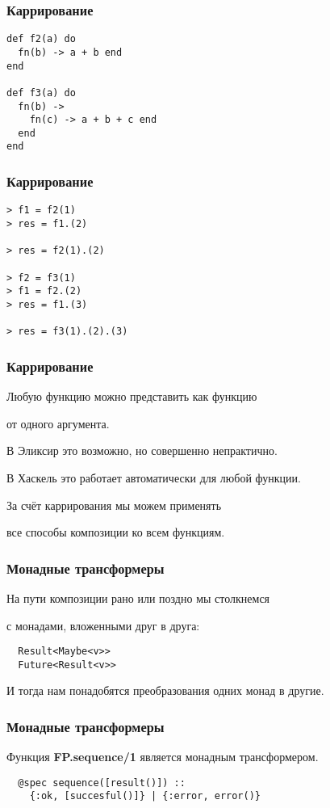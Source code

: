 \documentclass[10pt]{beamer}
\begin{document}
\begin{frame}[fragile]
  \frametitle{Каррирование}
  \begin{lstlisting}
def f2(a) do
  fn(b) -> a + b end
end

def f3(a) do
  fn(b) ->
    fn(c) -> a + b + c end
  end
end
  \end{lstlisting}
\end{frame}

\begin{frame}[fragile]
  \frametitle{Каррирование}
  \begin{lstlisting}
> f1 = f2(1)
> res = f1.(2)

> res = f2(1).(2)

> f2 = f3(1)
> f1 = f2.(2)
> res = f1.(3)

> res = f3(1).(2).(3)
  \end{lstlisting}
\end{frame}

\begin{frame}
  \frametitle{Каррирование}
  Любую функцию можно представить как функцию
  \par
  от одного аргумента.
  \par \bigskip
  В Эликсир это возможно, но совершенно непрактично.
  \par \bigskip
  В Хаскель это работает автоматически для любой функции.
  \par \bigskip
  За счёт каррирования мы можем применять
  \par
  все способы композиции ко всем функциям.
\end{frame}

\begin{frame}[fragile]
  \frametitle{Монадные трансформеры}
  На пути композиции рано или поздно мы столкнемся
  \par
  с монадами, вложенными друг в друга:
  \par \bigskip
  \begin{lstlisting}
  Result<Maybe<v>>
  Future<Result<v>>
  \end{lstlisting}
  \par \bigskip
  И тогда нам понадобятся преобразования одних монад в другие. 
\end{frame}

\begin{frame}[fragile]
  \frametitle{Монадные трансформеры}
  Функция \textbf{FP.sequence/1} является монадным трансформером.  
  \par \bigskip
  \begin{lstlisting}
  @spec sequence([result()]) ::
    {:ok, [succesful()]} | {:error, error()}
  \end{lstlisting}
\end{frame}
\end{document}
